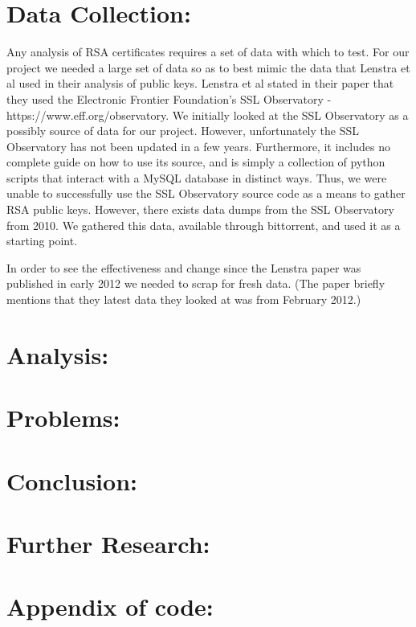 \documentclass[12pt]{article}
\begin{document}
\section{Data Collection:}
Any analysis of RSA certificates requires a set of data with which to test. For our project we needed a large set of data so as to best mimic the data that Lenstra
et al used in their analysis of public keys. Lenstra et al stated in their paper that they used the Electronic Frontier Foundation's SSL Observatory - https://www.eff.org/observatory. We initially looked at the SSL Observatory as a possibly source of data for our project. However, unfortunately the SSL Observatory has not been updated in a few years. Furthermore, it includes no complete guide on how to use its source, and is simply a collection of python scripts that interact with a MySQL database in distinct ways. Thus, we were unable to successfully use the SSL Observatory source code as a means to gather RSA public keys. However, there exists data dumps from the SSL Observatory from 2010. We gathered this data, available through bittorrent, and used it as a starting point.

In order to see the effectiveness and change since the Lenstra paper was published in early 2012 we needed to scrap for fresh data. (The paper briefly mentions that they latest data they looked at was from February 2012.)

\section{Analysis:}

\section{Problems:}

\section{Conclusion:}

\section{Further Research:}

\appendix
\section{Appendix of code:}
\end{document}
